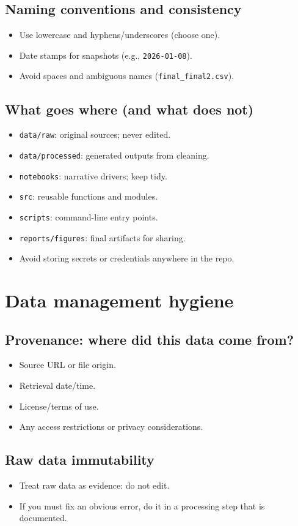 \subsection{Naming conventions and consistency}
\begin{itemize}
\item Use lowercase and hyphens/underscores (choose one).
\item Date stamps for snapshots (e.g., \texttt{2026-01-08}).
\item Avoid spaces and ambiguous names (\texttt{final\_final2.csv}).
\end{itemize}

\subsection{What goes where (and what does not)}
\begin{itemize}
\item \texttt{data/raw}: original sources; never edited.
\item \texttt{data/processed}: generated outputs from cleaning.
\item \texttt{notebooks}: narrative drivers; keep tidy.
\item \texttt{src}: reusable functions and modules.
\item \texttt{scripts}: command-line entry points.
\item \texttt{reports/figures}: final artifacts for sharing.
\item Avoid storing secrets or credentials anywhere in the repo.
\end{itemize}

\section{Data management hygiene}
\subsection{Provenance: where did this data come from?}
\begin{itemize}
\item Source URL or file origin.
\item Retrieval date/time.
\item License/terms of use.
\item Any access restrictions or privacy considerations.
\end{itemize}

\subsection{Raw data immutability}
\begin{itemize}
\item Treat raw data as evidence: do not edit.
\item If you must fix an obvious error, do it in a processing step that is documented.
\end{itemize}


